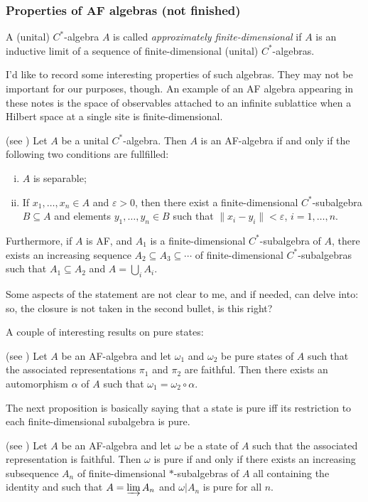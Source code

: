 \subsubsection{Properties of AF algebras (not finished)}
\begin{definition}
A (unital) $C^*$-algebra $A$ is called \emph{approximately finite-dimensional} if $A$ is an inductive limit of a sequence of finite-dimensional (unital) $C^*$-algebras.
\end{definition}
I'd like to record some interesting properties of such algebras. They may not be important for our purposes, though. An example of an AF algebra appearing in these notes is the space of observables attached to an infinite sublattice when a Hilbert space at a single site is finite-dimensional.
\begin{proposition} (see \cite{bratteli})
Let $A$ be a unital $C^*$-algebra. Then $A$ is an AF-algebra if and only if the following two conditions are fullfilled:
\begin{enumerate}[(i)]
\item $A$ is separable;
\item If $x_1,\ldots,x_n \in A$ and $\varepsilon > 0$, then there exist a finite-dimensional $C^*$-subalgebra $B \subseteq A$ and elements $y_1,\ldots,y_n \in B$ such that $\|x_i-y_i\| < \varepsilon$, $i=1,\ldots,n$.
\end{enumerate}
Furthermore, if $A$ is AF, and $A_1$ is a finite-dimensional $C^*$-subalgebra of $A$, there exists an increasing sequence $A_2 \subseteq A_3 \subseteq \cdots $ of finite-dimensional $C^*$-subalgebras such that $A_1 \subseteq A_2$ and $A = \bigcup_{i}A_i$.
\end{proposition}
Some aspects of the statement are not clear to me, and if needed, can delve into: so, the closure is not taken in the second bullet, is this right?

A couple of interesting results on pure states:
\begin{proposition}(see \cite{bratteli})
Let $A$ be an AF-algebra and let $\omega_1$ and $\omega_2$ be pure states of $A$ such that the associated representations $\pi_1$ and $\pi_2$ are faithful. Then there exists an automorphism $\alpha$ of $A$ such that $\omega_1 = \omega_2 \circ \alpha$.
\end{proposition}
The next proposition is basically saying that a state is pure iff its restriction to each finite-dimensional subalgebra is pure.
\begin{proposition}(see \cite{bratteli})
Let $A$ be an AF-algebra and let $\omega$ be a state of $A$ such that the associated representation is faithful. Then $\omega$ is pure if and only if there exists an increasing subsequence $A_n$ of finite-dimensional $\ast$-subalgebras of $A$ all containing the identity and such that $A = \varinjlim A_n$ and $\omega | A_n$ is pure for all $n$.
\end{proposition}

